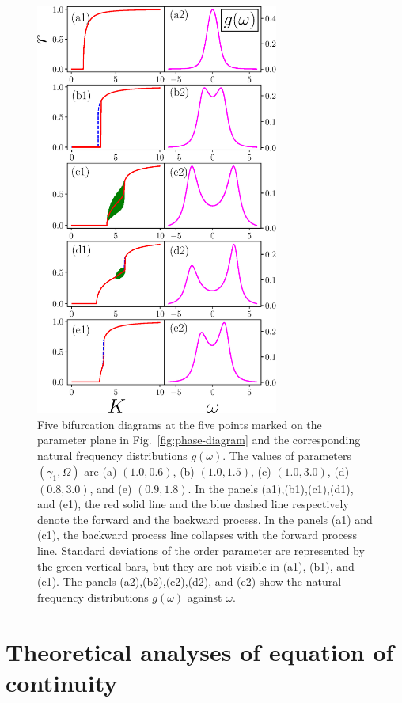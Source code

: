 \begin{figure}
  \centering
  \includegraphics[width=8cm]{figs/bifurcation.eps}
  \caption{Five bifurcation diagrams at the five points
    marked on the parameter plane in Fig.~\ref{fig:phase-diagram}
    and the corresponding natural frequency distributions $g(\omega)$.
    The values of parameters $(\gamma_{1},\Omega)$ are
    (a) $(1.0,0.6)$, (b) $(1.0,1.5)$, (c) $(1.0,3.0)$,
    (d) $(0.8,3.0)$, and (e) $(0.9,1.8)$.
    In the panels (a1),(b1),(c1),(d1), and (e1),
    the red solid line and the blue dashed line
    respectively denote the forward
    and the backward process.
    In the panels (a1) and (c1), the backward process line
    collapses with the forward process line.
    Standard deviations of the order parameter
    are represented by the green vertical bars,
    but they are not visible in (a1), (b1), and (e1).
    The panels (a2),(b2),(c2),(d2), and (e2)
    show the natural frequency distributions
    $g(\omega)$ against $\omega$.
    }
  \label{fig:bif-diagrams}
\end{figure}




\section{Theoretical analyses of equation of continuity}
\label{sec:analysis}

